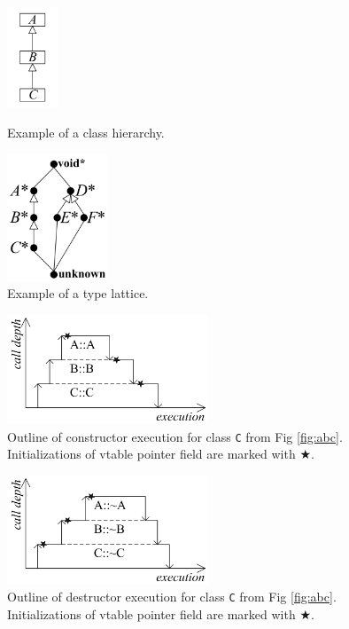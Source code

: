 \documentclass[10pt, conference, compsocconf]{IEEEtran}
\begin{document}
\begin{figure}[tb!]
\begin{minipage}[b]{0.49\linewidth}
\centering
  \includegraphics[height=3.0cm]{images/abc}
\caption{Example of a class hierarchy.}
\label{fig:abc}
\end{minipage}
\begin{minipage}[b]{0.49\linewidth}
\centering
  \includegraphics[width=3.0cm]{images/lattice}
\caption{Example of a type lattice.}
\label{fig:lattice}
\end{minipage}
\end{figure}

\begin{figure}[tb!]
\centering
  \includegraphics[width=6.0cm]{images/ctor}
\caption{Outline of constructor execution for class \lstinline{C} from Fig \ref{fig:abc}.
Initializations of vtable pointer field are marked with $\bigstar$.}
\label{fig:ctor}
\end{figure}

\begin{figure}[tb!]
\centering
  \includegraphics[width=6.0cm]{images/dtor}
\caption{Outline of destructor execution for class  \lstinline{C} from Fig \ref{fig:abc}.
Initializations of vtable pointer field are marked with $\bigstar$.}
\label{fig:dtor}
\end{figure}
\end{document}
